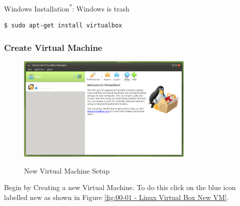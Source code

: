 Windows Installation\textsuperscript{*}: Windows is trash\cite{Docker:Windows_Install}
\begin{lstlisting}[language=bash]
    $ sudo apt-get install virtualbox
\end{lstlisting}

\let\thefootnote\relax{}
\subsubsection{Create Virtual Machine}
\begin{figure}[!htb]
    \centering
    \includegraphics[width=0.752\textwidth]{images/00-0.png}\\[0cm]  
    \caption[Virtual Box]{New Virtual Machine Setup}
    \label{fig:00-01 - Windows Virtual Box New VM} 
\end{figure}
Begin by Creating a new Virtual Machine. To do this click on the blue icon
labelled new as shown in Figure \vref{fig:00-01 - Linux Virtual Box New VM}.

